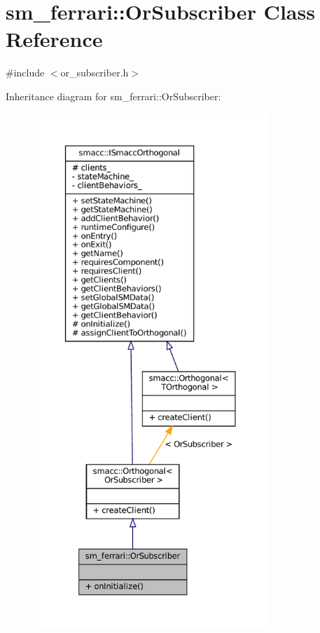 \hypertarget{classsm__ferrari_1_1OrSubscriber}{}\section{sm\+\_\+ferrari\+:\+:Or\+Subscriber Class Reference}
\label{classsm__ferrari_1_1OrSubscriber}


{\ttfamily \#include $<$or\+\_\+subscriber.\+h$>$}



Inheritance diagram for sm\+\_\+ferrari\+:\+:Or\+Subscriber\+:
\nopagebreak
\begin{figure}[H]
\begin{center}
\leavevmode
\includegraphics[height=550pt]{classsm__ferrari_1_1OrSubscriber__inherit__graph}
\end{center}
\end{figure}


